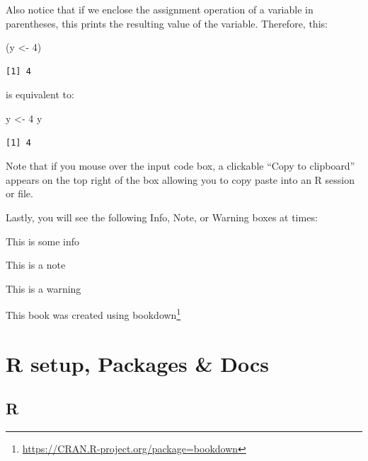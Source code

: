 \documentclass[
]{book}
\makeatletter
\newenvironment{Shaded}{\begin{snugshade}}{\end{snugshade}}
\newcommand{\DecValTok}[1]{\textcolor[rgb]{0.00,0.00,0.81}{#1}}
\newcommand{\NormalTok}[1]{#1}
\newcommand{\OtherTok}[1]{\textcolor[rgb]{0.56,0.35,0.01}{#1}}
\DeclareRobustCommand{\href}[2]{#2\footnote{\url{#1}}}
\renewcommand{\href}[2]{#2\footnote{\url{#1}}}
\newenvironment{kframe}{%
\medskip{}
\setlength{\fboxsep}{.8em}
 \def\at@end@of@kframe{}%
 \ifinner\ifhmode%
  \def\at@end@of@kframe{\end{minipage}}%
  \begin{minipage}{\columnwidth}%
 \fi\fi%
 \def\FrameCommand##1{\hskip\@totalleftmargin \hskip-\fboxsep
 \colorbox{shadecolor}{##1}\hskip-\fboxsep
     \hskip-\linewidth \hskip-\@totalleftmargin \hskip\columnwidth}%
 \MakeFramed {\advance\hsize-\width
   \@totalleftmargin\z@ \linewidth\hsize
   \@setminipage}}%
 {\par\unskip\endMakeFramed%
 \at@end@of@kframe}
\newenvironment{rmdblock}[1]
  {
  \begin{itemize}
  \renewcommand{\labelitemi}{
    \raisebox{-.7\height}[0pt][0pt]{
      {\setkeys{Gin}{width=3em,keepaspectratio}\texttt{[image: images/\#1]}}
    }
  }
  \setlength{\fboxsep}{1em}
  \begin{kframe}
  \item
  }
  {
  \end{kframe}
  \end{itemize}
  }
\newenvironment{note}
  {\begin{rmdblock}{note}}
  {\end{rmdblock}}
\newenvironment{info}
  {\begin{rmdblock}{info}}
  {\end{rmdblock}}
\newenvironment{warning}
  {\begin{rmdblock}{warning}}
  {\end{rmdblock}}
\makeatother
\begin{document}
Also notice that if we enclose the assignment operation of a variable in parentheses, this prints the resulting value of the variable. Therefore, this:

\begin{Shaded}
\begin{Highlighting}[]
\NormalTok{(y }\OtherTok{\textless{}{-}} \DecValTok{4}\NormalTok{)}
\end{Highlighting}
\end{Shaded}

\begin{verbatim}
[1] 4
\end{verbatim}

is equivalent to:

\begin{Shaded}
\begin{Highlighting}[]
\NormalTok{y }\OtherTok{\textless{}{-}} \DecValTok{4}
\NormalTok{y}
\end{Highlighting}
\end{Shaded}

\begin{verbatim}
[1] 4
\end{verbatim}

Note that if you mouse over the input code box, a clickable ``Copy to clipboard'' appears on the top right of the box allowing you to copy paste into an R session or file.

Lastly, you will see the following Info, Note, or Warning boxes at times:

\begin{info}
This is some info
\end{info}

\begin{note}
This is a note
\end{note}

\begin{warning}
This is a warning
\end{warning}

This book was created using \href{https://CRAN.R-project.org/package=bookdown}{bookdown} \citep{R-bookdown}

\hypertarget{Rsetup}{%
\chapter{R setup, Packages \& Docs}\label{Rsetup}}

\hypertarget{r}{%
\section{R}\label{r}}
\end{document}
